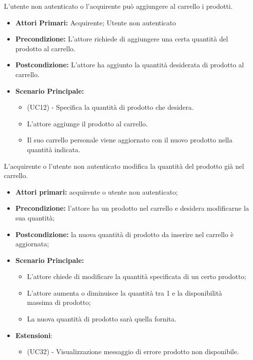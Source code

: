 L'utente non autenticato o l'acquirente può aggiungere al carrello i prodotti.
\begin{itemize}
    \item \textbf{Attori Primari:} Acquirente; Utente non autenticato
    \item \textbf{Precondizione:} L'attore richiede di aggiungere una certa quantità del prodotto al carrello. 
    \item \textbf{Postcondizione:} L'attore ha aggiunto la quantità desiderata di prodotto al carrello.
    \item \textbf{Scenario Principale:} 
    \begin{itemize}
        \item (UC12) - Specifica la quantità di prodotto che desidera.
        \item L'attore aggiunge il prodotto al carrello.
        \item Il suo carrello personale viene aggiornato con il nuovo prodotto nella quantità indicata.
    \end{itemize}
\end{itemize}

L'acquirente o l'utente non autenticato modifica la quantità del prodotto già nel carrello.
\begin{itemize}
    \item \textbf{Attori primari:} acquirente o utente non autenticato;
    \item \textbf{Precondizione:} l'attore ha un prodotto nel carrello e desidera modificarne la sua quantità;
    \item \textbf{Postcondizione:} la nuova quantità di prodotto da inserire nel carrello è aggiornata;
    \item \textbf{Scenario Principale:}
        \begin{itemize}
            \item L'attore chiede di modificare la quantità specificata di un certo prodotto;
            \item L'attore aumenta o diminuisce la quantità tra 1 e la disponibilità massima di prodotto;
            \item La nuova quantità di prodotto sarà quella fornita.
        \end{itemize}
    \item \textbf{Estensioni}:
    \begin{itemize}
        \item (UC32) - Visualizzazione messaggio di errore prodotto non disponibile.
    \end{itemize}
\end{itemize}

